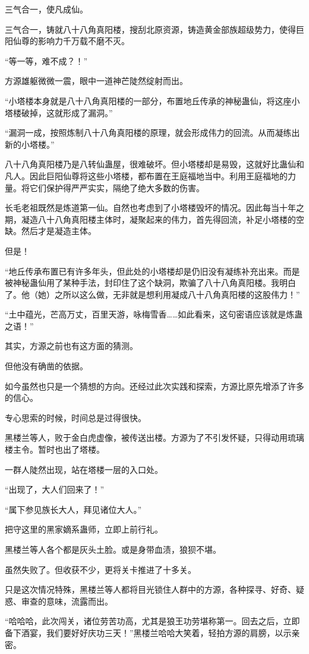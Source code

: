 \begin{this_body}
三气合一，使凡成仙。

三气合一，铸就八十八角真阳楼，搜刮北原资源，铸造黄金部族超级势力，使得巨阳仙尊的影响力千万载不磨不灭。

“等一等，难不成？！”

方源雄躯微微一震，眼中一道神芒陡然绽射而出。

“小塔楼本身就是八十八角真阳楼的一部分，布置地丘传承的神秘蛊仙，将这座小塔楼破掉，这就形成了漏洞。”

“漏洞一成，按照炼制八十八角真阳楼的原理，就会形成伟力的回流。从而凝练出新的小塔楼。”

八十八角真阳楼乃是八转仙蛊屋，很难破坏。但小塔楼却是易毁，这就好比蛊仙和凡人。因此巨阳仙尊将这些小塔楼，都布置在王庭福地当中。利用王庭福地的力量。将它们保护得严严实实，隔绝了绝大多数的伤害。

长毛老祖既然是炼道第一仙。自然也考虑到了小塔楼毁坏的情况。因此每当十年之期，凝造八十八角真阳楼主体时，凝聚起来的伟力，首先得回流，补足小塔楼的空缺。然后才是凝造主体。

但是！

“地丘传承布置已有许多年头，但此处的小塔楼却是仍旧没有凝练补充出来。而是被神秘蛊仙用了某种手法，封印住了这个缺洞，欺骗了八十八角真阳楼。我明白了。他（她）之所以这么做，无非就是想利用凝成八十八角真阳楼的这股伟力！”

“土中蕴光，芒高万丈，百里天游，咏梅雪香……如此看来，这句密语应该就是炼蛊之语！”

其实，方源之前也有这方面的猜测。

但他没有确凿的依据。

如今虽然也只是一个猜想的方向。还经过此次实践和探索，方源比原先增添了许多的信心。

专心思索的时候，时间总是过得很快。

黑楼兰等人，败于金白虎虚像，被传送出楼。方源为了不引发怀疑，只得动用琉璃楼主令。暂时也出了塔楼。

一群人陡然出现，站在塔楼一层的入口处。

“出现了，大人们回来了！”

“属下参见族长大人，拜见诸位大人。”

把守这里的黑家嫡系蛊师，立即上前行礼。

黑楼兰等人各个都是灰头土脸。或是身带血渍，狼狈不堪。

虽然失败了。但收获不少，更将关卡推进了十多关。

只是这次情况特殊，黑楼兰等人都将目光锁住人群中的方源，各种探寻、好奇、疑惑、审查的意味，流露而出。

“哈哈哈，此次闯关，诸位劳苦功高，尤其是狼王功劳堪称第一。回去之后，立即备下酒宴，我们要好好庆功三天！”黑楼兰哈哈大笑着，轻拍方源的肩膀，以示亲密。


\end{this_body}
